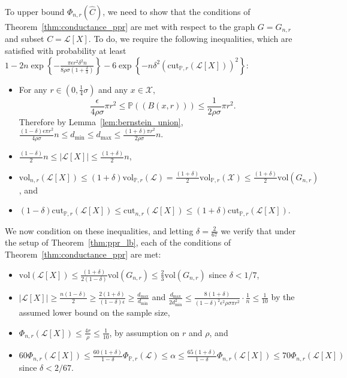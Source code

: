 \documentclass[11pt,twoside]{article}
\newcommand{\set}[1]{\left\{#1\right\}}
\newcommand{\vol}{\mathrm{vol}}
\newcommand{\cut}{\mathrm{cut}}
\newcommand{\abs}[1]{\left \lvert #1 \right \rvert}
\newcommand{\1}{\mathbbm{1}}
\newcommand{\Xbf}{X}
\newcommand{\Pbb}{\mathbb{P}}
\newcommand{\Cest}{\widehat{C}}
\begin{document}
To upper bound $\Phi_{n,r}(\Cest)$, we need to show that the conditions of Theorem~\ref{thm:conductance_ppr} are met with respect to the graph $G = G_{n,r}$ and subset $C = \mathcal{L}[\Xbf]$. To do, we require the following inequalities, which are satisfied with probability at least $1 - 2n\exp\set{-\frac{\pi\epsilon r^2\delta^2n}{8 \rho \sigma(1 + \frac{\delta}{3})}} - 6 \exp\set{-n\delta^2(\cut_{\Pbb,r}(\mathcal{L}[\Xbf]))^2}$: 
\begin{itemize}
	\item For any $r \in (0,\frac{1}{4}\sigma)$ and any $x \in \mathcal{X}$,
	\begin{equation*}
	\frac{\epsilon}{4\rho\sigma}\pi r^2 \leq \Pbb((B(x,r))) \leq  \frac{1}{2\rho\sigma} \pi r^2.
	\end{equation*}
	Therefore by Lemma~\ref{lem:bernstein_union}, $\frac{(1 - \delta)\epsilon \pi r^2}{4\rho \sigma}n \leq d_{\min} \leq d_{\max} \leq \frac{(1 + \delta)\pi r^2}{2\rho \sigma }n$. 
	\item $\frac{(1 - \delta)}{2} n \leq \abs{\mathcal{L}[\Xbf]} \leq \frac{(1 + \delta)}{2} n$, 
	\item $\vol_{n,r}(\mathcal{L}[\Xbf]) \leq (1 + \delta)\vol_{\Pbb,r}(\mathcal{L}) = \frac{(1 + \delta)}{2} \vol_{\Pbb,r}(\mathcal{X}) \leq \frac{(1 + \delta)}{2} \vol(G_{n,r})$, and
	\item $(1 - \delta) \cut_{\Pbb,r}(\mathcal{L}[\Xbf]) \leq \cut_{n,r}(\mathcal{L}[\Xbf]) \leq (1 + \delta) \cut_{\Pbb,r}(\mathcal{L}[\Xbf])$.
\end{itemize}
We now condition on these inequalities, and letting $\delta = \frac{2}{67}$ we verify that under the setup of Theorem~\ref{thm:ppr_lb}, each of the conditions of Theorem~\ref{thm:conductance_ppr} are met:
\begin{itemize}
	\item $\vol(\mathcal{L}[X]) \leq \frac{(1 + \delta)}{2(1 - \delta)}\vol(G_{n,r}) \leq \frac{2}{3}\vol(G_{n,r})$ since $\delta < 1/7$,
	\item $\abs{\mathcal{L}[X]} \geq \frac{n(1 - \delta)}{2} \geq \frac{2(1 + \delta)}{(1 - \delta)\epsilon} \geq \frac{d_{\max}}{d_{\min}}$ and $\frac{d_{\max}}{2d_{\min}^2} \leq \frac{8(1 + \delta)}{(1 - \delta)^2 \epsilon^2 \rho \sigma \pi r^2} \cdot \frac{1}{n} \leq \frac{1}{10}$ by the assumed lower bound on the sample size,
	\item $\Phi_{n,r}(\mathcal{L}[X]) \leq \frac{4r}{\rho} \leq \frac{1}{10}$, by assumption on $r$ and $\rho$, and
	\item $60\Phi_{n,r}(\mathcal{L}[X]) \leq \frac{60(1 + \delta)}{1 - \delta}\Phi_{\Pbb,r}(\mathcal{L}) \leq \alpha \leq \frac{65(1 + \delta)}{1 - \delta}\Phi_{n,r}(\mathcal{L}[X]) \leq 70\Phi_{n,r}(\mathcal{L}[X])$ since $\delta < 2/67$. 
\end{itemize}
\end{document}
